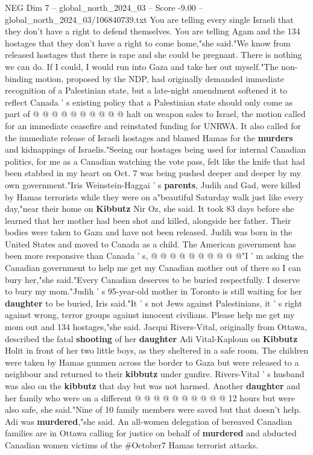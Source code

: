 \begin{textsample}{NEG Dim 7 – global\_north\_2024\_03 – Score -9.00 – global\_north\_2024\_03/106840739.txt}
You are telling every single Israeli that they don't have a right to defend themselves.
You are telling Agam and the 134 hostages that they don't have a right to come home,"she said."We know from released hostages that there is rape and she could be pregnant.
There is nothing we can do.
If I could, I would run into Gaza and take her out myself."The non-binding motion, proposed by the NDP, had originally demanded immediate recognition of a Palestinian state, but a late-night amendment softened it to reflect Canada ' s existing policy that a Palestinian state should only come as part of @ @ @ @ @ @ @ @ @ @ halt on weapon sales to Israel, the motion called for an immediate ceasefire and reinstated funding for UNRWA.
It also called for the immediate release of Israeli hostages and blamed Hamas for the \textbf{murders} and kidnappings of Israelis."Seeing our hostages being used for internal Canadian politics, for me as a Canadian watching the vote pass, felt like the knife that had been stabbed in my heart on Oct. 7 was being pushed deeper and deeper by my own government."Iris Weinstein-Haggai ' s \textbf{parents}, Judih and Gad, were killed by Hamas terrorists while they were on a"beautiful Saturday walk just like every day,"near their home on \textbf{Kibbutz} Nir Oz, she said.
It took 83 days before she learned that her mother had been shot and killed, alongside her father.
Their bodies were taken to Gaza and have not been released.
Judih was born in the United States and moved to Canada as a child.
The American government has been more responsive than Canada ' s, @ @ @ @ @ @ @ @ @ @"I ' m asking the Canadian government to help me get my Canadian mother out of there so I can bury her,"she said."Every Canadian deserves to be buried respectfully.
I deserve to bury my mom."Judih ' s 95-year-old mother in Toronto is still waiting for her \textbf{daughter} to be buried, Iris said."It ' s not Jews against Palestinians, it ' s right against wrong, terror groups against innocent civilians.
Please help me get my mom out and 134 hostages,"she said.
Jacqui Rivers-Vital, originally from Ottawa, described the fatal \textbf{shooting} of her \textbf{daughter} Adi Vital-Kaploun on \textbf{Kibbutz} Holit in front of her two little boys, as they sheltered in a safe room.
The children were taken by Hamas gunmen across the border to Gaza but were released to a neighbour and returned to their \textbf{kibbutz} under gunfire.
Rivers-Vital ' s husband was also on the \textbf{kibbutz} that day but was not harmed.
Another \textbf{daughter} and her family who were on a different @ @ @ @ @ @ @ @ @ @ 12 hours but were also safe, she said."Nine of 10 family members were saved but that doesn't help.
Adi was \textbf{murdered},"she said.
An all-women delegation of bereaved Canadian families are in Ottawa calling for justice on behalf of \textbf{murdered} and abducted Canadian women victims of the \#October7 Hamas terrorist attacks.

\end{textsample}
